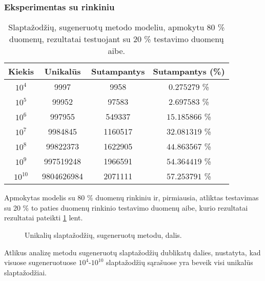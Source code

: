 \documentclass{VUMIFInfBakalaurinis}
\begin{document}
\subsubsection{Eksperimentas su  rinkiniu} %
\label{sec:pgpcfg}
\begin{table}[hb]
  \centering
  \caption{
    Slaptažodžių, sugeneruotų  metodo modeliu, apmokytu 80 \% 
     duomenų, rezultatai testuojant su 20 \% 
     testavimo duomenų aibe.
  }
  \begin{tabular}{|c|c|c|c|}
    \hline \textbf{Kiekis} & \textbf{Unikalūs} & \textbf{Sutampantys} & 
    \textbf{Sutampantys (\%)} \\
    \hline $10^4$ & 9997 & 9958 & $0.275279$ \% \\
    \hline $10^5$ & 99952 & 97583 & $2.697583$ \% \\
    \hline $10^6$ & 997955 & 549337 & $15.185866$ \% \\
    \hline $10^7$ & 9984845 & 1160517 & $32.081319$ \% \\
    \hline $10^8$ & 99822373 & 1622905 & $44.863567$ \% \\
    \hline $10^9$ & 997519248 & 1966591 & $54.364419$ \% \\
    \hline $10^{10}$ & 9804626984 & 2071111 & $57.253791$ \% \\
    \hline
  \end{tabular}
  \label{tab:pcfg-rockyou-results}
\end{table}
Apmokytas modelis su 80 \%  duomenų rinkiniu ir, pirmiausia, 
atliktas testavimas su 20 \% to paties duomenų rinkinio testavimo duomenų aibe, 
kurio rezultatai rezultatai pateikti \ref{tab:pcfg-rockyou-results} lent.

\begin{figure}[!ht]
  \begin{center}
  \end{center}
  \caption{
    Unikalių slaptažodžių, sugeneruotų  metodu, dalis.
  }
  \label{plot:pcfg-rockyou-duplicates}
\end{figure}
Atlikus analizę  metodu sugeneruotų slaptažodžių dublikatų 
dalies, nustatyta, kad visuose sugeneruotuose $10^4$-$10^{10}$ slaptažodžių 
sąrašuose yra beveik visi unikalūs slaptažodžiai.
\end{document}
